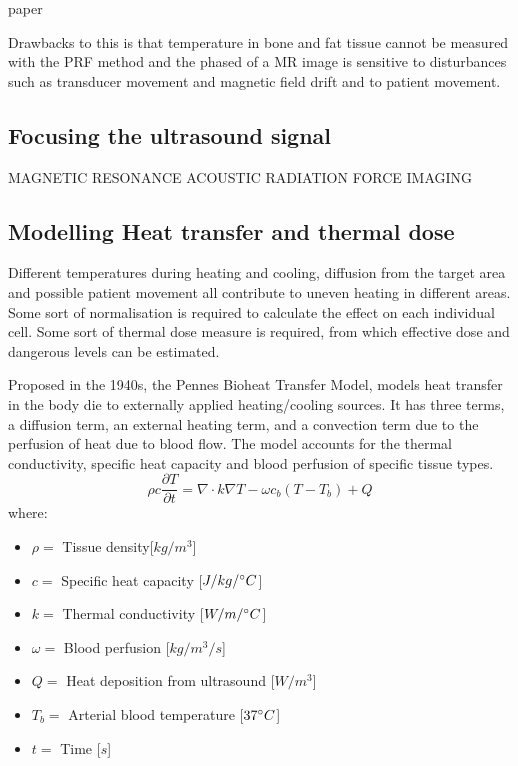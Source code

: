 \documentclass[11pt]{article} %
\begin{document}
	
	 paper \cite{Rieke2008}
	
	Drawbacks to this is that temperature in bone and fat tissue cannot be measured with the PRF method and the phased of a MR image is sensitive to disturbances such as transducer movement and magnetic field drift and to patient movement.
	
	
	

	
	\subsection{Focusing the ultrasound signal}
	
		MAGNETIC RESONANCE ACOUSTIC RADIATION FORCE IMAGING 	\cite{Hosseini2018}
		
	
	\subsection{Modelling Heat transfer and thermal dose}
	
	Different temperatures during heating and cooling, diffusion from the target area and possible patient movement all contribute to uneven heating in different areas. Some sort of normalisation is required to calculate the effect on each individual cell. Some sort of thermal dose measure is required, from which effective dose and dangerous levels can be estimated. 
	
	Proposed in the 1940s, the Pennes Bioheat Transfer Model, \cite{Pennes1948} models heat transfer in the body die to externally applied heating/cooling sources. It has three terms, a diffusion term, an external heating term, and a convection term due to the perfusion of heat due to blood flow. The model accounts for the thermal conductivity, specific heat capacity and blood perfusion of specific tissue types. 
	\begin{equation}
		\rho c \frac{\partial T}{\partial t}= \nabla\cdot k \nabla T-\omega c_b (T-T_b)+Q
	\end{equation}
	where:
	
	\begin{itemize}
		\item $ \rho = $ Tissue density[$ kg/m^3 $]
		\item  $ c= $ Specific heat capacity [$ J/kg/\degree C  $]
		\item $ k= $ Thermal conductivity  [$ W/m/\degree C $]
		\item $ \omega = $ Blood perfusion [$ kg/m^3/s $]
		\item $ Q= $ Heat deposition from ultrasound $ [W/m^3 $]
		\item $ T_b= $ Arterial blood temperature [$ 37\degree C $]
		\item $ t= $ Time [$ s $]
	\end{itemize}
	
\end{document}
